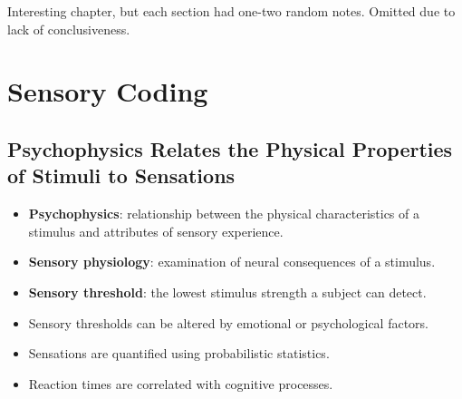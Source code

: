 \documentclass[12pt,a4paper]{article}
\begin{document}
\begin{center}
    Interesting chapter, but each section had one-two random notes. Omitted due to lack of conclusiveness.
\end{center}


\clearpage
{}

\clearpage
\section{Sensory Coding}
\subsection{Psychophysics Relates the Physical Properties of Stimuli to Sensations}
\begin{itemize}
    \item \textbf{Psychophysics}: relationship between the physical characteristics of a stimulus and attributes of sensory experience.
    \item \textbf{Sensory physiology}: examination of neural consequences of a stimulus.
    \item \textbf{Sensory threshold}: the lowest stimulus strength a subject can detect.
    \item Sensory thresholds can be altered by emotional or psychological factors.
    \item Sensations are quantified using probabilistic statistics.
    \item Reaction times are correlated with cognitive processes.
\end{itemize}
\end{document}
